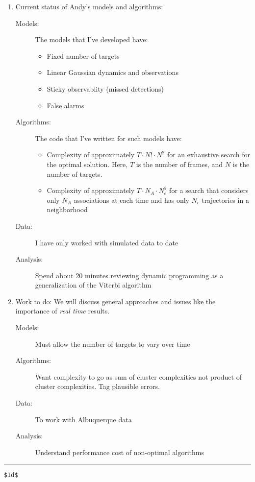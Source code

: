 \documentclass{article}
\begin{document}
\begin{enumerate}
\item Current status of Andy's models and algorithms:
  \begin{description}
  \item[Models:] The models that I've developed have:
    \begin{itemize}
    \item Fixed number of targets
    \item Linear Gaussian dynamics and observations
    \item Sticky observablity (missed detections)
    \item False alarms
    \end{itemize}
  \item[Algorithms:]  The code that I've written for such models have:
    \begin{itemize}
    \item Complexity of approximately $T\cdot N!\cdot N^2$ for an
      exhaustive search for the optimal solution.  Here, $T$ is the
      number of frames, and $N$ is the number of targets.
    \item Complexity of approximately $T\cdot N_A\cdot N_\epsilon^2$ for
      a search that considers only $N_A$ associations at each time
      and has only $N_\epsilon$ trajectories in a neighborhood
    \end{itemize}
  \item[Data:] I have only worked with simulated data to date
  \item[Analysis:] Spend about 20 minutes reviewing dynamic
    programming as a generalization of the Viterbi algorithm
  \end{description}
\item Work to do:
  We will discuss general approaches and issues like the importance of
  \emph{real time} results.
  \begin{description}
  \item[Models:] Must allow the number of targets to vary over time
  \item[Algorithms:] Want complexity to go as sum of cluster
    complexities not product of cluster complexities.  Tag plausible
    errors.
  \item[Data:] To work with Albuquerque data
  \item[Analysis:] Understand performance cost of non-optimal
    algorithms
  \end{description}
\end{enumerate}

\vfill \hrule
\begin{verbatim}
$Id$
\end{verbatim}
\end{document}
